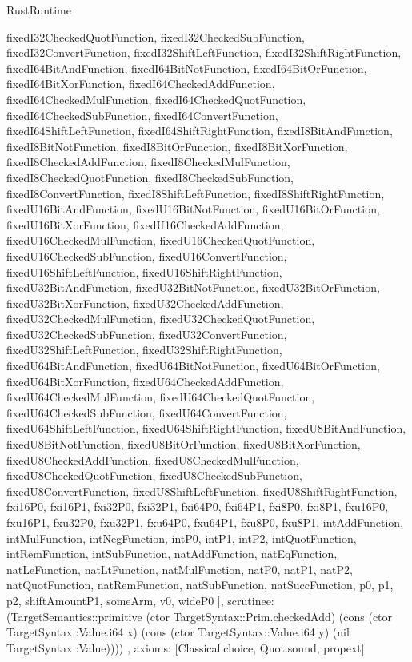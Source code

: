 \begin{lexlean}{RustRuntime}
\begin{semanticmodule}
{{      fixedI32CheckedQuotFunction,
      fixedI32CheckedSubFunction,
      fixedI32ConvertFunction,
      fixedI32ShiftLeftFunction,
      fixedI32ShiftRightFunction,
      fixedI64BitAndFunction,
      fixedI64BitNotFunction,
      fixedI64BitOrFunction,
      fixedI64BitXorFunction,
      fixedI64CheckedAddFunction,
      fixedI64CheckedMulFunction,
      fixedI64CheckedQuotFunction,
      fixedI64CheckedSubFunction,
      fixedI64ConvertFunction,
      fixedI64ShiftLeftFunction,
      fixedI64ShiftRightFunction,
      fixedI8BitAndFunction,
      fixedI8BitNotFunction,
      fixedI8BitOrFunction,
      fixedI8BitXorFunction,
      fixedI8CheckedAddFunction,
      fixedI8CheckedMulFunction,
      fixedI8CheckedQuotFunction,
      fixedI8CheckedSubFunction,
      fixedI8ConvertFunction,
      fixedI8ShiftLeftFunction,
      fixedI8ShiftRightFunction,
      fixedU16BitAndFunction,
      fixedU16BitNotFunction,
      fixedU16BitOrFunction,
      fixedU16BitXorFunction,
      fixedU16CheckedAddFunction,
      fixedU16CheckedMulFunction,
      fixedU16CheckedQuotFunction,
      fixedU16CheckedSubFunction,
      fixedU16ConvertFunction,
      fixedU16ShiftLeftFunction,
      fixedU16ShiftRightFunction,
      fixedU32BitAndFunction,
      fixedU32BitNotFunction,
      fixedU32BitOrFunction,
      fixedU32BitXorFunction,
      fixedU32CheckedAddFunction,
      fixedU32CheckedMulFunction,
      fixedU32CheckedQuotFunction,
      fixedU32CheckedSubFunction,
      fixedU32ConvertFunction,
      fixedU32ShiftLeftFunction,
      fixedU32ShiftRightFunction,
      fixedU64BitAndFunction,
      fixedU64BitNotFunction,
      fixedU64BitOrFunction,
      fixedU64BitXorFunction,
      fixedU64CheckedAddFunction,
      fixedU64CheckedMulFunction,
      fixedU64CheckedQuotFunction,
      fixedU64CheckedSubFunction,
      fixedU64ConvertFunction,
      fixedU64ShiftLeftFunction,
      fixedU64ShiftRightFunction,
      fixedU8BitAndFunction,
      fixedU8BitNotFunction,
      fixedU8BitOrFunction,
      fixedU8BitXorFunction,
      fixedU8CheckedAddFunction,
      fixedU8CheckedMulFunction,
      fixedU8CheckedQuotFunction,
      fixedU8CheckedSubFunction,
      fixedU8ConvertFunction,
      fixedU8ShiftLeftFunction,
      fixedU8ShiftRightFunction,
      fxi16P0,
      fxi16P1,
      fxi32P0,
      fxi32P1,
      fxi64P0,
      fxi64P1,
      fxi8P0,
      fxi8P1,
      fxu16P0,
      fxu16P1,
      fxu32P0,
      fxu32P1,
      fxu64P0,
      fxu64P1,
      fxu8P0,
      fxu8P1,
      intAddFunction,
      intMulFunction,
      intNegFunction,
      intP0,
      intP1,
      intP2,
      intQuotFunction,
      intRemFunction,
      intSubFunction,
      natAddFunction,
      natEqFunction,
      natLeFunction,
      natLtFunction,
      natMulFunction,
      natP0,
      natP1,
      natP2,
      natQuotFunction,
      natRemFunction,
      natSubFunction,
      natSuccFunction,
      p0,
      p1,
      p2,
      shiftAmountP1,
      someArm,
      v0,
      wideP0
    ],
    scrutinee: (TargetSemantics::primitive (ctor TargetSyntax::Prim.checkedAdd) (cons (ctor TargetSyntax::Value.i64 x) (cons (ctor TargetSyntax::Value.i64 y) (nil TargetSyntax::Value))))
  },
  axioms: [Classical.choice, Quot.sound, propext]
}


\end{semanticmodule}
\end{lexlean}
